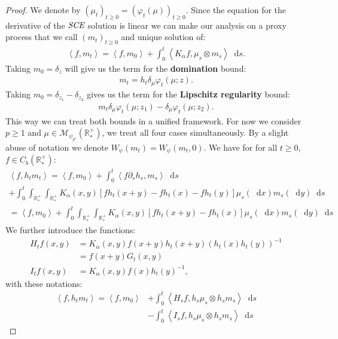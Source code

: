 \documentclass[11pt,a4paper]{article}
\newcommand{\RRP}{\mathbb{R}^+_*}
\newcommand{\MC}{\mathcal{M}}
\newcommand{\SCE}{\emph{SCE}}
\newcommand{\Proc}[1]{\left(#1\right)_{t\geq 0}}
\newcommand{\brac}[1]{\left\langle#1\right\rangle}
\newcommand{\dd}{\mathop{}\!\mathrm{d}}
\begin{document}
\begin{proof}
    We denote by $\Proc{\mu_t} = \Proc{\varphi_t(\mu)}$. Since the equation for the derivative of the $\SCE$  solution is linear we can make our analysis on a proxy process that we call $\Proc{m_t}$ and unique solution of:
    \begin{align*}
        \brac{f,m_t} = \brac{f,m_0} + \int_0^t \brac{K_\alpha f,\mu_s\otimes m_s} \dd s.
    \end{align*}
    Taking $m_0 = \delta_z$ will give us the term for the \textbf{domination} bound:
    \begin{align*}
        m_t = h_t\delta_\mu \varphi_t(\mu;z).
    \end{align*}
    Taking $m_0 = \delta_{z_1} - \delta_{z_2}$ gives us the term for the \textbf{Lipschitz regularity} bound: 
    \begin{align*}
        m_t \delta_\mu \varphi_t(\mu;z_1) - \delta_\mu \varphi_t(\mu;z_2).
    \end{align*}
    This way we can treat both bounds in a unified framework. For now we consider $p \geq 1$ and $\mu \in \MC_{\psi_{p'}}(\RRP)$, we treat all four cases simultaneously.
    By a slight abuse of notation we denote $W_{\psi}(m_t) = W_{\psi}(m_t,0)$. We have for for all $t\geq 0$, $f \in C_b(\RRP)$:
    \begin{multline*}
        \brac{f,h_tm_t} = \brac{f,m_0} + \int_0^t \brac{f \partial_s h_s,m_s} \dd s \\
        + \int_0^t \int_{\RRP}\int_{\RRP}K_\alpha(x,y) \left[fh_t(x+y) - fh_t(x) - fh_t(y) \right] \mu_s(\dd x) m_s(\dd y) \dd s \\
        = \brac{f,m_0} + \int_0^t \int_{\RRP}\int_{\RRP}K_\alpha(x,y) \left[fh_t(x+y) - fh_t(x)\right] \mu_s(\dd x) m_s(\dd y) \dd s
    \end{multline*}
    We further introduce the functions:
    \begin{align*}
        H_tf(x,y) &= K_\alpha(x,y) f(x+y) h_t(x+y)\left(h_t(x)h_t(y)\right)^{-1} \\
        &= f(x+y) G_t(x,y)\\
        I_tf(x,y) &= K_\alpha(x,y)f(x) h_t(y)^{-1},
    \end{align*}
    with these notations:
    \begin{subequations}
    \begin{align}
        \brac{f,h_tm_t} = \brac{f,m_0} &+ \int_0^t \brac{H_sf,h_s\mu_s \otimes h_s m_s} \dd s\label{proof:eq:wass-rescaled-SCE-1}\\
        &-\int_0^t \brac{I_sf,h_s\mu_s \otimes h_s m_s} \dd s\label{proof:eq:wass-rescaled-SCE-2}
    \end{align}
    \label{proof:eq:wass-rescaled-SCE}
    \end{subequations}


\end{proof}
\end{document}
